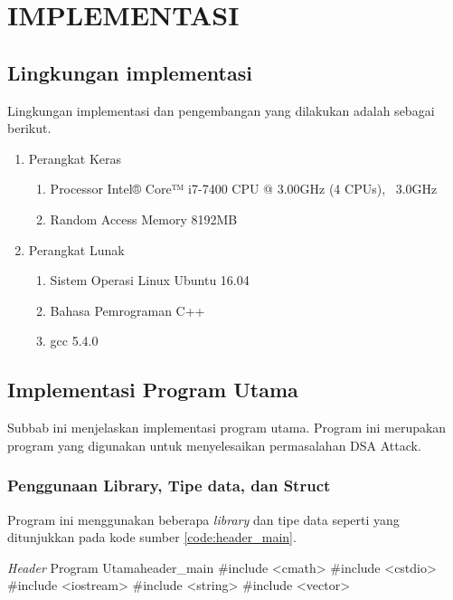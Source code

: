 \chapter {IMPLEMENTASI}

\section{Lingkungan implementasi}

Lingkungan implementasi dan pengembangan yang dilakukan adalah sebagai berikut.
\begin{enumerate}
  \item Perangkat Keras
  \begin{enumerate}
    \item Processor Intel® Core™ i7-7400 CPU @ 3.00GHz (4 CPUs), ~3.0GHz
    \item Random Access Memory 8192MB
  \end{enumerate}
  \item Perangkat Lunak
  \begin{enumerate}
    \item Sistem Operasi Linux Ubuntu 16.04
    \item Bahasa Pemrograman C++
    \item gcc 5.4.0
  \end{enumerate}
\end{enumerate}

\section{Implementasi Program Utama}

Subbab ini menjelaskan implementasi program utama. Program ini merupakan program yang digunakan untuk menyelesaikan permasalahan DSA Attack.

\subsection{Penggunaan Library, Tipe data, dan Struct}

Program ini menggunakan beberapa \textit{library} dan tipe data seperti yang ditunjukkan pada kode sumber \ref{code:header_main}.

\begin{code}[firstnumber=1,float]{\textit{Header} Program Utama}{header_main}
#include <cmath>
#include <cstdio>
#include <iostream>
#include <string>
#include <vector>
\end{code}